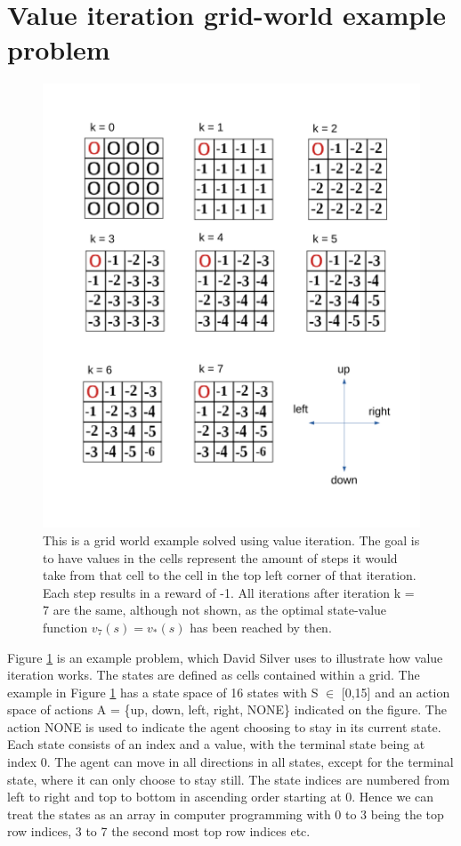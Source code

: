 \section{Value iteration grid-world example problem}
\begin{figure}[!htb]
	\centering
	\includegraphics[width=0.5\linewidth]{Dynamic_Programming/fig/value_iteration_grid_world.pdf}
	\caption{This is a grid world example solved using value iteration. The goal is to have values in the cells represent the amount of steps it would take from that cell to the cell in the top left corner of that iteration. Each step results in a reward of -1. All iterations after iteration k = 7 are the same, although not shown, as the optimal state-value function $v_7(s) = v_*(s)$ has been reached by then.}
	\label{fig:grid_world}
\end{figure}
\noindent Figure \ref{fig:grid_world} is an example problem, which David Silver \cite{David_Silver} uses to illustrate how value iteration works. The states are defined as cells contained within a grid. The example in Figure \ref{fig:grid_world} has a state space of 16 states with S $\in$ [0,15] and an action space of actions A = \{up, down, left, right, NONE\} indicated on the figure. The action NONE is used to indicate the agent choosing to stay in its current state. Each state consists of an index and a value, with the terminal state being at index 0. The agent can move in all directions in all states, except for the terminal state, where it can only choose to stay still. The state indices are numbered from left to right and top to bottom in ascending order starting at 0. Hence we can treat the states as an array in computer programming with 0 to 3 being the top row indices, 3 to 7 the second most top row indices etc.

